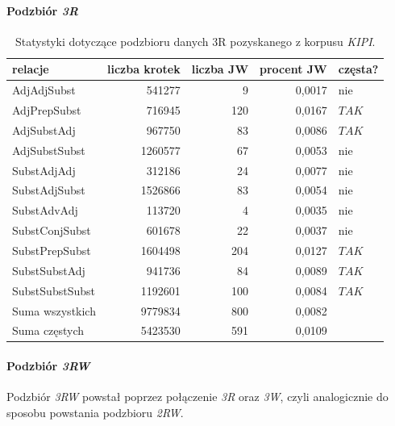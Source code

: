 \documentclass[11pt,a4paper]{llncs}
\begin{document}
\paragraph{Podzbiór \protect\textit{3R}}
\begin{table}[h!]
\centering
\begin{tabular}{ l | r | r | r | l }
	\toprule
	\textbf{relacje} 	& \textbf{liczba krotek} & \textbf{liczba JW} & \textbf{procent JW} & \textbf{częsta?} 	\\
	\midrule
	AdjAdjSubst	&	541277	&	9	&	0,0017	&	nie	\\
	AdjPrepSubst	&	716945	&	120	&	0,0167	&	$ TAK $	\\
	AdjSubstAdj	&	967750	&	83	&	0,0086	&	$ TAK $	\\
	AdjSubstSubst	&	1260577	&	67	&	0,0053	&	nie	\\
	SubstAdjAdj	&	312186	&	24	&	0,0077	&	nie	\\
	SubstAdjSubst	&	1526866	&	83	&	0,0054	&	nie	\\
	SubstAdvAdj	&	113720	&	4	&	0,0035	&	nie	\\
	SubstConjSubst	&	601678	&	22	&	0,0037	&	nie	\\
	SubstPrepSubst	&	1604498	&	204	&	0,0127	&	$ TAK $	\\
	SubstSubstAdj	&	941736	&	84	&	0,0089	&	$ TAK $	\\
	SubstSubstSubst	&	1192601	&	100	&	0,0084	&	$ TAK $	\\
	\midrule									
	Suma wszystkich	&	9779834	&	800	&	0,0082	&		\\
	Suma częstych	&	5423530	&	591	&	0,0109	&		\\
	\bottomrule
\end{tabular}
\caption[Statystyki podzbioru danych \emph{KIPI} 3R]{Statystyki dotyczące podzbioru danych 3R pozyskanego z korpusu \emph{KIPI}.}
\label{KIPI_3R_stats}
\end{table}


\paragraph{Podzbiór \protect\textit{3RW}}
Podzbiór \emph{3RW} powstał poprzez połączenie \emph{3R} oraz \emph{3W}, czyli analogicznie do sposobu powstania podzbioru \emph{2RW}.
\end{document}
